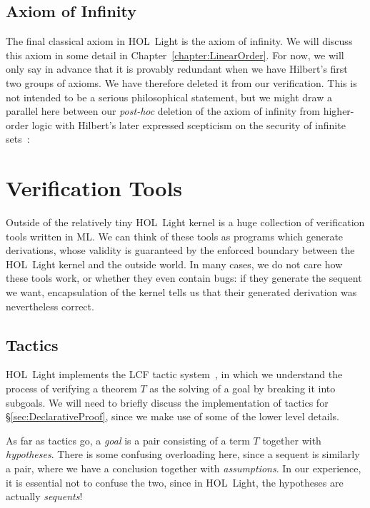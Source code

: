 \subsection{Axiom of Infinity}\label{sec:InfinityDescription}
The final classical axiom in HOL~Light is the axiom of infinity. We will discuss this axiom in some detail in Chapter~\ref{chapter:LinearOrder}. For now, we will only say in advance that it is provably redundant when we have Hilbert's first two groups of axioms. We have therefore deleted it from our verification. This is not intended to be a serious philosophical statement, but we might draw a parallel here between our \emph{post-hoc} deletion of the axiom of infinity from higher-order logic with Hilbert's later expressed scepticism on the security of infinite sets~\cite{OnInfinite}: 

\section{Verification Tools}
Outside of the relatively tiny HOL~Light kernel is a huge collection of verification tools written in ML. We can think of these tools as programs which generate derivations, whose validity is guaranteed by the enforced boundary between the HOL~Light kernel and the outside world. In many cases, we do not care how these tools work, or whether they even contain bugs: if they generate the sequent we want, encapsulation of the kernel tells us that their generated derivation was nevertheless correct.

\subsection{Tactics}
HOL~Light implements the LCF tactic system~\cite{Tactics}, in which we understand the process of verifying a theorem $T$ as the solving of a goal by breaking it into subgoals. We will need to briefly discuss the implementation of tactics for \S\ref{sec:DeclarativeProof}, since we make use of some of the lower level details.

As far as tactics go, a \emph{goal} is a pair consisting of a term $T$ together with \emph{hypotheses}. There is some confusing overloading here, since a sequent is similarly a pair, where we have a conclusion together with \emph{assumptions}. In our experience, it is essential not to confuse the two, since in HOL~Light, the hypotheses are actually \emph{sequents}!

